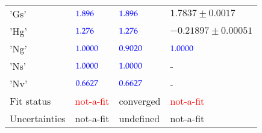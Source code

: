 \documentclass[12pt]{report}
\begin{document}
\begin{table}
\begin{center}
{\begin{tabular}{lp{3.81cm}p{3.81cm}p{3.81cm}}
  'Gs' & $\textcolor{blue}{ 1.896 }$& $\textcolor{blue}{ 1.896 }$& $1.7837 \pm 0.0017$  \\ 
  'Hg' & $\textcolor{blue}{ 1.276 }$& $\textcolor{blue}{ 1.276 }$& $-0.21897 \pm 0.00051$  \\ 
  'Ng' & $\textcolor{blue}{ 1.0000 }$& $\textcolor{blue}{ 0.9020 }$& $\textcolor{blue}{ 1.0000 }$  \\ 
  'Ns' & $\textcolor{blue}{ 1.0000 }$& $\textcolor{blue}{ 1.0000 }$& -   \\ 
  'Nv' & $\textcolor{blue}{ 0.6627 }$& $\textcolor{blue}{ 0.6627 }$& -   \\ 
      \midrule
  \rowcolor{white}
 Fit status   & \textcolor{red}{ not-a-fit } & converged & \textcolor{red}{ not-a-fit }  \\ 
  \rowcolor{white}
 Uncertainties   & not-a-fit & undefined & not-a-fit  \\ 
      \bottomrule
    \end{tabular}
  }
  \end{center}
\end{table}
\end{document}
